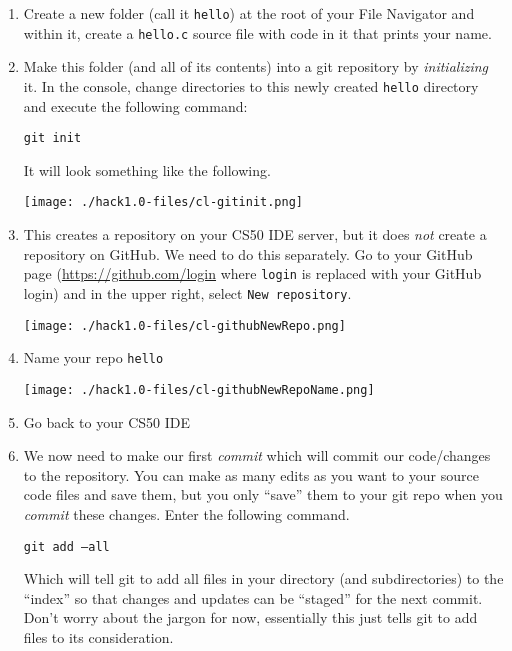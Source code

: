 \documentclass[12pt]{scrartcl}
\begin{document}
\begin{enumerate}
  \item Create a new folder (call it \texttt{hello}) 
  at the root of your File Navigator and within it, create a 
  \texttt{hello.c} source file with code in it that
  prints your name.
  
  \item Make this folder (and all of its contents) into a git
  repository by \emph{initializing} it.  In the console, change
  directories to this newly created \texttt{hello}
  directory and execute the following command:
  
  \texttt{git init}
  
  It will look something like the following.
  \begin{center}
  \texttt{[image: ./hack1.0-files/cl-gitinit.png]}
  \end{center}

  \item This creates a repository on your CS50 IDE server, but it
  does \emph{not} create a repository on GitHub.  We need to do 
  this separately.  Go to your GitHub page (\url{https://github.com/login}
  where \texttt{login} is replaced with your GitHub
  login) and in the upper right, select \texttt{New repository}.

  \begin{center}
  \texttt{[image: ./hack1.0-files/cl-githubNewRepo.png]}
  \end{center}

  \item Name your repo \texttt{hello}
  \begin{center}
  \texttt{[image: ./hack1.0-files/cl-githubNewRepoName.png]}
  \end{center}

  \item Go back to your CS50 IDE
  
  \item We now need to make our first \emph{commit} which will commit
  our code/changes to the repository.  You can make as many edits as
  you want to your source code files and save them, but you only ``save''
  them to your git repo when you \emph{commit} these changes.  Enter
  the following command.
  
  \texttt{git add --all}
  
  Which will tell git to add all files in your directory 
  (and subdirectories) to the ``index'' so that changes and
  updates can be ``staged'' for the next commit.  Don't 
  worry about the jargon for now, essentially this just tells
  git to add files to its consideration.
  

\end{enumerate}
\end{document}
